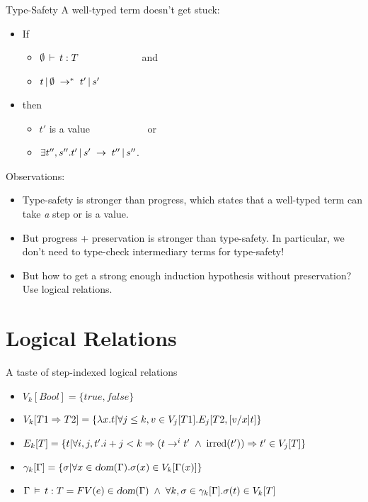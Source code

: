 \documentclass{beamer}
\begin{document}
\begin{frame}[fragile]{Type-Safety}
A well-typed term doesn't get stuck:
\begin{itemize}
\item If
\begin{itemize}
  \item $\emptyset \ts t \typ T$ \ \ \ \ \ \ \ \ \ \ \ \ and
  \item $\reductionl t \emptyset {t'} {s'} *$
\end{itemize}
\item then
\begin{itemize}
  \item $t'$ is a value \ \ \ \ \ \ \ \ \ \ \ or
  \item $\exists t'', s''. \reduction {t'} {s'} {t''} {s''}$.
\end{itemize}
\end{itemize}

Observations:
\begin{itemize}
\item Type-safety is stronger than progress, which states that a
  well-typed term can take \emph{a} step or is a value.
\item But progress + preservation is stronger than type-safety. In
  particular, we don't need to type-check intermediary terms for
  type-safety!
\item But how to get a strong enough induction hypothesis without
  preservation? Use logical relations.
\end{itemize}
\end{frame}


\section{Logical Relations}

\begin{frame}[fragile]{A taste of step-indexed logical relations}
\begin{itemize}
\item $V_k[Bool] = \{ true, false \}$
\item $V_k[T1 \Rightarrow T2] = \{ {\lambda}x.t | \forall j \leq k, v \in V_j[T1] . E_j[T2, {\subst v x t}]\}$
\item $E_k[T] = \{ t | \forall i, j, t'. i+j<k \Rightarrow (t \rightarrow^i t' \andl \text{irred}(t')) \Rightarrow t' \in V_j[T] \}$
\item $\gamma_k[\Gamma] = \{\sigma | \forall x \in \dom(\Gamma). \sigma(x) \in V_k[\Gamma(x)]\}$
\item $\Gamma \ds t : T = FV(e) \in \dom(\Gamma) \andl \forall k, \sigma \in \gamma_k[\Gamma]. \sigma(t) \in V_k[T]$
\end{itemize}
\end{frame}
\end{document}
